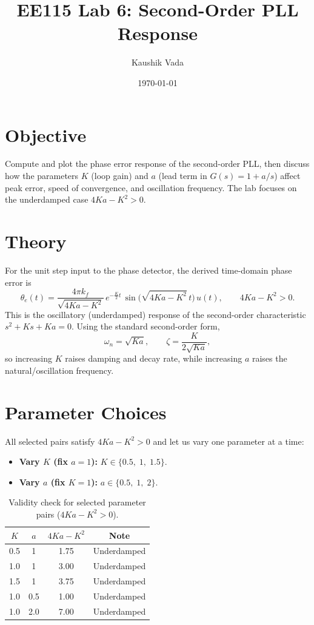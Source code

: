 \documentclass[11pt]{article}
\title{EE115 Lab 6: Second-Order PLL Response}
\author{Kaushik Vada}
\date{\today}
\begin{document}
\maketitle

\section{Objective}
Compute and plot the phase error response of the second-order PLL, then discuss how the parameters $K$ (loop gain) and $a$ (lead term in $G(s)=1+a/s$) affect peak error, speed of convergence, and oscillation frequency. The lab focuses on the underdamped case $4Ka-K^2>0$.

\section{Theory}
For the unit step input to the phase detector, the derived time-domain phase error is
\begin{equation}
  \theta_e(t)=\frac{4\pi k_f}{\sqrt{4Ka-K^2}}\,
  e^{-\frac{K}{2}t}\,
  \sin\!\big(\sqrt{4Ka-K^2}\,t\big)\,u(t),
  \qquad 4Ka-K^2>0.
  \label{eq:theta}
\end{equation}
This is the oscillatory (underdamped) response of the second-order characteristic $s^2+Ks+Ka=0$. Using the standard second-order form,
\[
  \omega_n=\sqrt{Ka}, \qquad \zeta=\frac{K}{2\sqrt{Ka}},
\]
so increasing $K$ raises damping and decay rate, while increasing $a$ raises the natural/oscillation frequency.

\section{Parameter Choices}
All selected pairs satisfy $4Ka-K^2>0$ and let us vary one parameter at a time:
\begin{itemize}[leftmargin=1.5em]
  \item \textbf{Vary $K$ (fix $a=1$):} $K\in\{0.5,\;1,\;1.5\}$.
  \item \textbf{Vary $a$ (fix $K=1$):} $a\in\{0.5,\;1,\;2\}$.
\end{itemize}

\begin{table}[H]
  \centering
  \caption{Validity check for selected parameter pairs ($4Ka-K^2>0$).}
  \label{tab:param-validity}
  \begin{tabular}{@{}cccc@{}}
    \toprule
    $K$ & $a$ & $4Ka-K^2$ & Note \\
    \midrule
    0.5 & 1   & 1.75 & Underdamped \\
    1.0 & 1   & 3.00 & Underdamped \\
    1.5 & 1   & 3.75 & Underdamped \\
    1.0 & 0.5 & 1.00 & Underdamped \\
    1.0 & 2.0 & 7.00 & Underdamped \\
    \bottomrule
  \end{tabular}
\end{table}
\FloatBarrier
\end{document}
